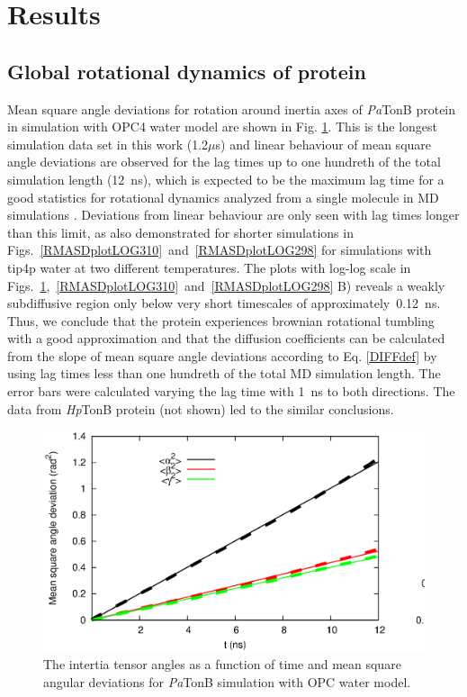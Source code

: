 \documentclass[pre,aps,floatfix,authordate1-4,twocolumn]{revtex4-1}
\begin{document}
\section{Results}

\subsection{Global rotational dynamics of protein}
Mean square angle deviations for rotation around inertia axes
of {\it Pa}TonB protein in simulation with OPC4 water model
are shown in Fig. \ref{RMASDplot}. This is the longest
simulation data set in this work (1.2$\mu$s) and
linear behaviour of mean square angle deviations are observed
for the lag times up to one hundreth of the total simulation length (12~ns),
which is expected to be the maximum lag time for a good statistics
for rotational dynamics analyzed from a single molecule in MD simulations \cite{lu06}.
Deviations from linear behaviour are only seen with lag times longer
than this limit, as also demonstrated for shorter simulations in
Figs.~\ref{RMASDplotLOG310}~and~\ref{RMASDplotLOG298} for simulations with tip4p water at
two different temperatures. The plots with log-log scale in
Figs.~\ref{RMASDplot},~\ref{RMASDplotLOG310}~and~\ref{RMASDplotLOG298} B)
reveals a weakly subdiffusive region only below very short timescales
of approximately~0.12~ns. Thus, we conclude that the protein
experiences brownian rotational tumbling with  a good approximation
and that the diffusion coefficients can be calculated from the slope of mean square angle
deviations according to Eq. \ref{DIFFdef} by using lag times less than
one hundreth of the total MD simulation length.
The error bars were calculated varying the lag time with 1~ns to both directions.
The data from {\it Hp}TonB protein (not shown) led to the similar conclusions.
\begin{figure}[htb]
  \includegraphics[width=16.5cm]{../Figs/RMASDplotPsTonBOPC4.eps}%
  \caption{The intertia tensor angles as a function of time and mean square angular
    deviations for {\it Pa}TonB simulation with OPC water model.
    \label{RMASDplot}}%
\end{figure}
\end{document}
